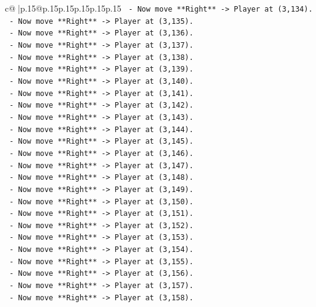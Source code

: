 \documentclass{article}
\begin{document}
{\begin{supertabular}{c@{$\;$}|p{.15\linewidth}@{}p{.15\linewidth}p{.15\linewidth}p{.15\linewidth}p{.15\linewidth}p{.15\linewidth}}
{{{\texttt{    {-}   Now move **Right** {-}> Player at (3,134).} \\
\texttt{    {-}   Now move **Right** {-}> Player at (3,135).} \\
\texttt{    {-}   Now move **Right** {-}> Player at (3,136).} \\
\texttt{    {-}   Now move **Right** {-}> Player at (3,137).} \\
\texttt{    {-}   Now move **Right** {-}> Player at (3,138).} \\
\texttt{    {-}   Now move **Right** {-}> Player at (3,139).} \\
\texttt{    {-}   Now move **Right** {-}> Player at (3,140).} \\
\texttt{    {-}   Now move **Right** {-}> Player at (3,141).} \\
\texttt{    {-}   Now move **Right** {-}> Player at (3,142).} \\
\texttt{    {-}   Now move **Right** {-}> Player at (3,143).} \\
\texttt{    {-}   Now move **Right** {-}> Player at (3,144).} \\
\texttt{    {-}   Now move **Right** {-}> Player at (3,145).} \\
\texttt{    {-}   Now move **Right** {-}> Player at (3,146).} \\
\texttt{    {-}   Now move **Right** {-}> Player at (3,147).} \\
\texttt{    {-}   Now move **Right** {-}> Player at (3,148).} \\
\texttt{    {-}   Now move **Right** {-}> Player at (3,149).} \\
\texttt{    {-}   Now move **Right** {-}> Player at (3,150).} \\
\texttt{    {-}   Now move **Right** {-}> Player at (3,151).} \\
\texttt{    {-}   Now move **Right** {-}> Player at (3,152).} \\
\texttt{    {-}   Now move **Right** {-}> Player at (3,153).} \\
\texttt{    {-}   Now move **Right** {-}> Player at (3,154).} \\
\texttt{    {-}   Now move **Right** {-}> Player at (3,155).} \\
\texttt{    {-}   Now move **Right** {-}> Player at (3,156).} \\
\texttt{    {-}   Now move **Right** {-}> Player at (3,157).} \\
\texttt{    {-}   Now move **Right** {-}> Player at (3,158).} \\
}}}
\end{supertabular}}
\end{document}

